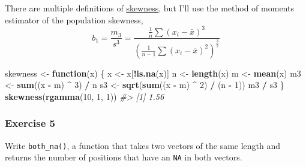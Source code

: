 \documentclass[]{book}
\newenvironment{Shaded}{\begin{snugshade}}{\end{snugshade}}
\newcommand{\CommentTok}[1]{\textcolor[rgb]{0.56,0.35,0.01}{\textit{#1}}}
\newcommand{\ControlFlowTok}[1]{\textcolor[rgb]{0.13,0.29,0.53}{\textbf{#1}}}
\newcommand{\DecValTok}[1]{\textcolor[rgb]{0.00,0.00,0.81}{#1}}
\newcommand{\KeywordTok}[1]{\textcolor[rgb]{0.13,0.29,0.53}{\textbf{#1}}}
\newcommand{\NormalTok}[1]{#1}
\newcommand{\OperatorTok}[1]{\textcolor[rgb]{0.81,0.36,0.00}{\textbf{#1}}}
\newcommand{\StringTok}[1]{\textcolor[rgb]{0.31,0.60,0.02}{#1}}
\theoremstyle{plain}
\theoremstyle{remark}
\theoremstyle{definition}
\theoremstyle{definition}
\theoremstyle{definition}
\theoremstyle{remark}
\begin{document}
There are multiple definitions of
\href{https://en.wikipedia.org/wiki/Skewness}{skewness}, but I'll use
the method of moments estimator of the population skewness, \[
b_1 =  \frac{m_3}{s^3} = \frac{\frac{1}{n} \sum (x_i - \bar{x}) ^ 3}{{\left(\frac{1}{n - 1} \sum (x_i - \bar{x}) ^ 2\right)} ^ \frac{3}{2}}
\]

\begin{Shaded}
\begin{Highlighting}[]
\NormalTok{skewness <-}\StringTok{ }\ControlFlowTok{function}\NormalTok{(x) \{}
\NormalTok{  x <-}\StringTok{ }\NormalTok{x[}\OperatorTok{!}\KeywordTok{is.na}\NormalTok{(x)]}
\NormalTok{  n <-}\StringTok{ }\KeywordTok{length}\NormalTok{(x)}
\NormalTok{  m <-}\StringTok{ }\KeywordTok{mean}\NormalTok{(x)}
\NormalTok{  m3 <-}\StringTok{ }\KeywordTok{sum}\NormalTok{((x }\OperatorTok{-}\StringTok{ }\NormalTok{m) }\OperatorTok{^}\StringTok{ }\DecValTok{3}\NormalTok{) }\OperatorTok{/}\StringTok{ }\NormalTok{n}
\NormalTok{  s3 <-}\StringTok{ }\KeywordTok{sqrt}\NormalTok{(}\KeywordTok{sum}\NormalTok{((x }\OperatorTok{-}\StringTok{ }\NormalTok{m) }\OperatorTok{^}\StringTok{ }\DecValTok{2}\NormalTok{) }\OperatorTok{/}\StringTok{ }\NormalTok{(n }\OperatorTok{-}\StringTok{ }\DecValTok{1}\NormalTok{))}
\NormalTok{  m3 }\OperatorTok{/}\StringTok{ }\NormalTok{s3}
\NormalTok{\}}
\KeywordTok{skewness}\NormalTok{(}\KeywordTok{rgamma}\NormalTok{(}\DecValTok{10}\NormalTok{, }\DecValTok{1}\NormalTok{, }\DecValTok{1}\NormalTok{))}
\CommentTok{#> [1] 1.56}
\end{Highlighting}
\end{Shaded}

\hypertarget{exercise-5-16}{%
\subsubsection{Exercise 5}\label{exercise-5-16}}

Write \texttt{both\_na()}, a function that takes two vectors of the same
length and returns the number of positions that have an \texttt{NA} in
both vectors.
\end{document}
